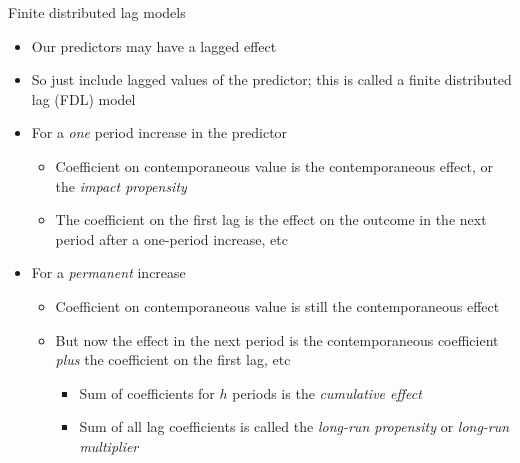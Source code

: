 \documentclass[
  ignorenonframetext,
]{beamer}
\providecommand{\tightlist}{%
  \setlength{\itemsep}{0pt}\setlength{\parskip}{0pt}}
\newcommand{\setsep}{\setlength{\itemsep}{3pt}}
\newcommand{\setskip}{\setlength{\parskip}{3pt}}
\renewcommand{\tightlist}{\setsep\setskip}
\begin{document}
\begin{frame}{Finite distributed lag models}
\label{finite-distributed-lag-models}
\pause

\begin{itemize}[<+->]
\tightlist
\item
  Our predictors may have a lagged effect
\item
  So just include lagged values of the predictor;
  this is called a finite distributed lag (FDL) model
\item
  For a \emph{one} period increase in the predictor

  \begin{itemize}[<+->]
  \tightlist
  \item
    Coefficient on contemporaneous value is the contemporaneous effect, or the \emph{impact propensity}
  \item
    The coefficient on the first lag is the effect on the outcome in the next period after a one-period increase, etc
  \end{itemize}
\item
  For a \emph{permanent} increase

  \begin{itemize}[<+->]
  \tightlist
  \item
    Coefficient on contemporaneous value is still the contemporaneous effect
  \item
    But now the effect in the next period is the contemporaneous coefficient \emph{plus} the coefficient on the first lag, etc

    \begin{itemize}[<+->]
    \tightlist
    \item
      Sum of coefficients for \(h\) periods is the \emph{cumulative effect}
    \item
      Sum of all lag coefficients is called the \emph{long-run propensity} or \emph{long-run multiplier}
    \end{itemize}
  \end{itemize}
\end{itemize}
\end{frame}
\end{document}
